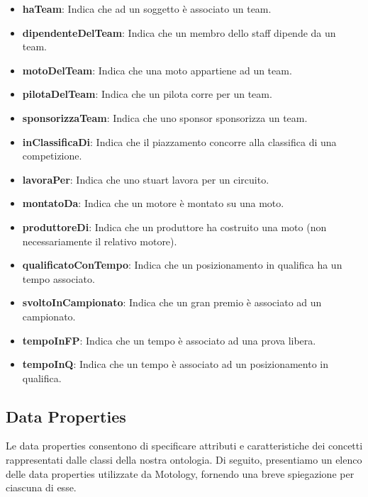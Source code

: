 \begin{itemize}
    \item \textbf{haTeam}: Indica che ad un soggetto è associato un team.
    \item \textbf{dipendenteDelTeam}: Indica che un membro dello staff dipende da un team.
    \item \textbf{motoDelTeam}: Indica che una moto appartiene ad un team.
    \item \textbf{pilotaDelTeam}: Indica che un pilota corre per un team.
    \item \textbf{sponsorizzaTeam}: Indica che uno sponsor sponsorizza un team.
	
    \item \textbf{inClassificaDi}: Indica che il piazzamento concorre alla classifica di una competizione.
    \item \textbf{lavoraPer}: Indica che uno stuart lavora per un circuito.
    \item \textbf{montatoDa}: Indica che un motore è montato su una moto.
    \item \textbf{produttoreDi}: Indica che un produttore ha costruito una moto (non necessariamente il relativo motore).
    \item \textbf{qualificatoConTempo}: Indica che un posizionamento in qualifica ha un tempo associato.
    \item \textbf{svoltoInCampionato}: Indica che un gran premio è associato ad un campionato.
    \item \textbf{tempoInFP}: Indica che un tempo è associato ad una prova libera.
    \item \textbf{tempoInQ}: Indica che un tempo è associato ad un posizionamento in qualifica.
\end{itemize}

\subsection{Data Properties}
Le data properties consentono di specificare attributi e caratteristiche dei concetti rappresentati dalle classi della nostra ontologia. Di seguito, presentiamo un elenco delle data properties utilizzate da Motology, fornendo una breve spiegazione per ciascuna di esse.\\

